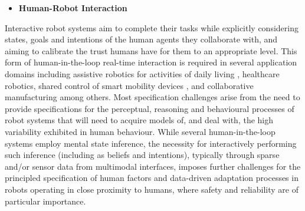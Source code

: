 \documentclass[sigconf,nonacm]{acmart}%
\begin{document}
	\begin{itemize}[leftmargin=0.5cm]
		\item \textbf{Human-Robot Interaction}%
	\end{itemize}
	Interactive robot systems aim to complete their tasks while explicitly considering states, goals and intentions of the human agents they collaborate with, and aiming to calibrate the trust humans have for them to an appropriate level. This form of human-in-the-loop real-time interaction is required in several application domains including assistive robotics for activities of daily living \cite{GaoEtAl2020}, healthcare robotics, shared control of smart mobility devices \cite{SohDemiris2015}, and collaborative manufacturing among others. Most specification challenges arise from the need to provide specifications for the perceptual, reasoning and behavioural processes of robot systems that will need to acquire models of, and deal with, the high variability exhibited in human behaviour. 
	While several human-in-the-loop systems employ mental state inference, the necessity for interactively performing such inference (including as beliefs and intentions), typically through sparse and/or sensor data from multimodal interfaces, imposes further challenges for the principled specification of human factors and data-driven adaptation processes in robots operating in close proximity to humans, where safety and reliability are of particular importance. 
	
\end{document}
